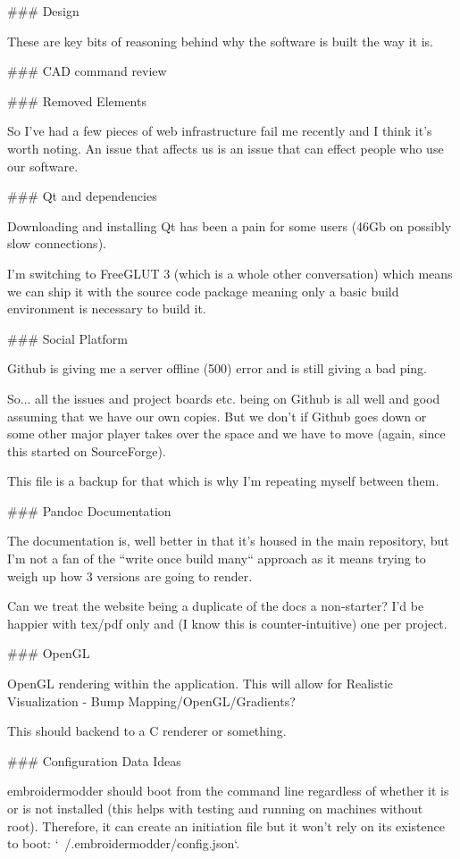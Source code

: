 ### Design

These are key bits of reasoning behind why the software is built the way it is.

### CAD command review



### Removed Elements

So I've had a few pieces of web infrastructure fail me recently and
I think it's worth noting. An issue that affects us is an issue that
can effect people who use our software.

### Qt and dependencies

Downloading and installing Qt has been a pain for some users
(46Gb on possibly slow connections).

I'm switching to FreeGLUT 3 (which is a whole other conversation) which means we
can ship it with the source code package meaning only a basic build
environment is necessary to build it.

### Social Platform

Github is giving me a server offline (500) error and is still giving a bad ping.

So... all the issues and project boards etc. being on Github is all well and good assuming that we have our own copies. But we don't if Github goes down or some other major player takes over the space and we have to move (again, since this started on SourceForge).

This file is a backup for that which is why I'm repeating myself between them.

### Pandoc Documentation

The documentation is, well better in that it's housed in the main repository,
but I'm not a fan of the ``write once build many`` approach as it means
trying to weigh up how 3 versions are going to render.

Can we treat the website being a duplicate of the docs a non-starter?
I'd be happier with tex/pdf only and (I know this is counter-intuitive) one
per project.

### OpenGL

OpenGL rendering within the application. This will allow for
Realistic Visualization - Bump Mapping/OpenGL/Gradients?

This should backend to a C renderer or something.

### Configuration Data Ideas

embroidermodder should boot from the command line
regardless of whether it is or is not installed (this helps with testing and
running on machines without root). Therefore, it can create an initiation file
but it won't rely on its existence to boot: `~/.embroidermodder/config.json`.

